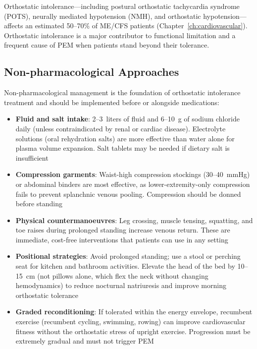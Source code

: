 Orthostatic intolerance---including postural orthostatic tachycardia syndrome (POTS), neurally mediated hypotension (NMH), and orthostatic hypotension---affects an estimated 50--70\% of ME/CFS patients (Chapter~\ref{ch:cardiovascular}). Orthostatic intolerance is a major contributor to functional limitation and a frequent cause of PEM when patients stand beyond their tolerance.

\subsection{Non-pharmacological Approaches}

Non-pharmacological management is the foundation of orthostatic intolerance treatment and should be implemented before or alongside medications:

\begin{itemize}
    \item \textbf{Fluid and salt intake}: 2--3~liters of fluid and 6--10~g of sodium chloride daily (unless contraindicated by renal or cardiac disease). Electrolyte solutions (oral rehydration salts) are more effective than water alone for plasma volume expansion. Salt tablets may be needed if dietary salt is insufficient
    \item \textbf{Compression garments}: Waist-high compression stockings (30--40~mmHg) or abdominal binders are most effective, as lower-extremity-only compression fails to prevent splanchnic venous pooling. Compression should be donned before standing
    \item \textbf{Physical countermanoeuvres}: Leg crossing, muscle tensing, squatting, and toe raises during prolonged standing increase venous return. These are immediate, cost-free interventions that patients can use in any setting
    \item \textbf{Positional strategies}: Avoid prolonged standing; use a stool or perching seat for kitchen and bathroom activities. Elevate the head of the bed by 10--15~cm (not pillows alone, which flex the neck without changing hemodynamics) to reduce nocturnal natriuresis and improve morning orthostatic tolerance
    \item \textbf{Graded reconditioning}: If tolerated within the energy envelope, recumbent exercise (recumbent cycling, swimming, rowing) can improve cardiovascular fitness without the orthostatic stress of upright exercise. Progression must be extremely gradual and must not trigger PEM
\end{itemize}

